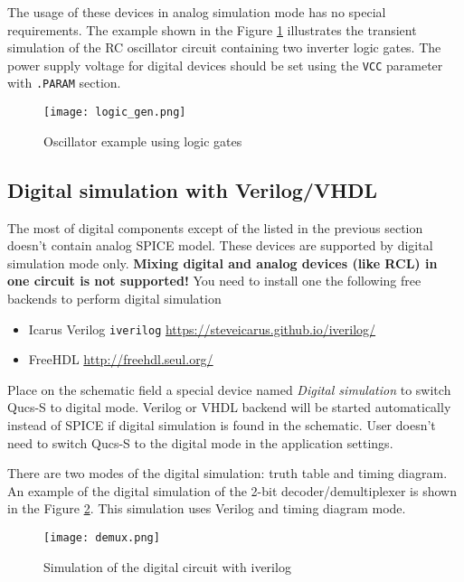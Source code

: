 The usage of these devices in analog simulation mode has no special requirements. The example shown in the Figure \ref{fig:logic_gen} illustrates the transient simulation of the RC oscillator circuit containing two inverter logic gates. The power supply voltage for digital devices should be set using the \verb|VCC| parameter with \verb|.PARAM| section.

    \begin{figure}[!ht]
    \begin{center}
        \texttt{[image: logic\_gen.png]}
    \end{center}
    \caption{Oscillator example using logic gates} \label{fig:logic_gen}
    \end{figure}


\subsection{Digital simulation with Verilog/VHDL} \label{sec:digi}

The most of digital components except of the listed in the previous section doesn't contain analog SPICE model. These devices are  supported by digital simulation mode only. \textbf{Mixing digital and analog devices (like RCL) in one circuit is not supported!} You need to install one the following free backends to perform digital simulation

\begin{itemize}
 \item Icarus Verilog \verb|iverilog| \url{https://steveicarus.github.io/iverilog/}
 \item FreeHDL \url{http://freehdl.seul.org/}
\end{itemize}


Place on the schematic field a special device named \emph{Digital simulation} to switch Qucs-S to digital mode. Verilog or VHDL backend will be started automatically instead of SPICE if digital simulation is found in the schematic. User doesn't need to switch
Qucs-S to the digital mode in the application settings.

There are two modes of the digital simulation: truth table and timing diagram. An example of the digital simulation of the 2-bit decoder/demultiplexer is shown in the Figure \ref{fig:demux}. This simulation uses Verilog and timing diagram mode.

    \begin{figure}[!ht]
    \begin{center}
        \texttt{[image: demux.png]}
    \end{center}
    \caption{Simulation of the digital circuit with iverilog} \label{fig:demux}
    \end{figure}


